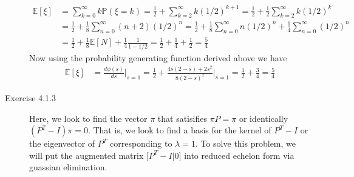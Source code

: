 \documentclass[12pt]{article}  %
\newcommand{\E}{{\mathbb{E}}}
\newcommand{\prob}{{\mathbb{P}}}
\begin{document}
\begin{description}
\begin{align*}
\E[\xi] &= \sum_{k = 0}^{\infty}k\prob(\xi = k) = \frac{1}{2} + \sum_{k = 2}^{\infty}k(1/2)^{k+1} = \frac{1}{2} + \frac{1}{2}\sum_{k=2}^{\infty}k(1/2)^{k}\\
&=\frac{1}{2} + \frac{1}{8}\sum_{n=0}^{\infty}(n+2)(1/2)^{n} =\frac{1}{2} + \frac{1}{8}\sum_{n=0}^{\infty}n(1/2)^{n} + \frac{1}{4}\sum_{n=0}^{\infty}(1/2)^{n}\\
&=\frac{1}{2} + \frac{1}{8}\E[N] + \frac{1}{4}\frac{1}{1 -1/2} = \frac{1}{2} + \frac{1}{4} + \frac{1}{2} = \frac{5}{4}
\end{align*}
Now using the probability generating function derived above we have 
\begin{align*}
\E[\xi] &= \frac{d\phi(s)}{ds}\Big\vert_{s = 1} = \frac{1}{2} + \frac{4s(2-s) + 2s^2}{8(2-s)^2}\Big\vert_{s = 1} = \frac{1}{2} + \frac{3}{4} = \frac{5}{4}
\end{align*}


\item[Exercise 4.1.3] Here, we look to find the vector $\pi$ that satisifies $\pi P = \pi$ or identically $(P^T - I)\pi = 0$. That is, we look to find a basis for the kernel of $P^{T}-I$ or the eigenvector of $P^T$ corresponding to $\lambda = 1$. To solve this problem, we will put the augmented matrix $\Big[P^T - I\Big\vert 0\Big]$ into reduced echelon form via guassian elimination. 



\end{description}
\end{document}
